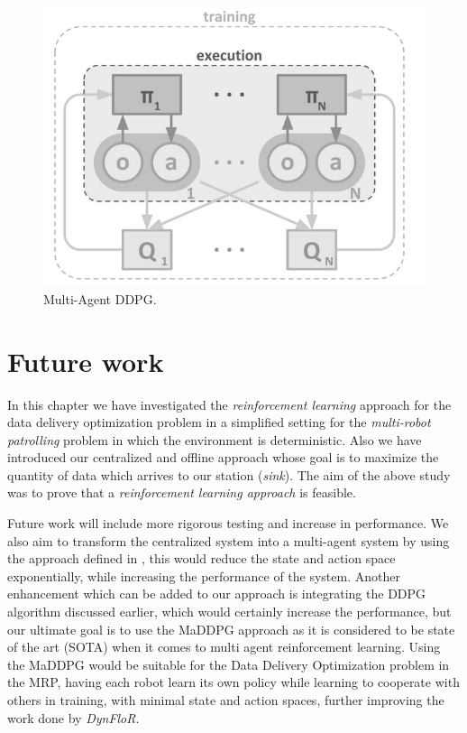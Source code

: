 \begin{figure}[!htb]
\centering
\includegraphics[scale=0.4]{Figures/maddpg.jpg}
\caption{Multi-Agent DDPG.}
\label{fig:maddpg}
\end{figure}

\section{Future work}
In this chapter we have investigated the \emph{reinforcement learning} approach for the data delivery optimization problem in a simplified setting for the \emph{multi-robot patrolling} problem in which the environment is deterministic. Also we have introduced our centralized and offline approach whose goal is to maximize the quantity of data which arrives to our station (\emph{sink}). The aim of the above study was to prove that a \emph{reinforcement learning approach} is feasible.
\par Future work will include more rigorous testing and increase in performance. We also aim to transform the centralized system into a multi-agent system by using the approach defined in \cite{zhang2019multiagent}, this would reduce the state and action space exponentially, while increasing the performance of the system. Another enhancement which can be added to our approach is integrating the DDPG algorithm discussed earlier, which would certainly increase the performance, but our ultimate goal is to use the MaDDPG approach as it is considered to be state of the art (SOTA) when it comes to multi agent reinforcement learning. Using the MaDDPG would be suitable for the Data Delivery Optimization problem in the MRP, having each robot learn its own policy while learning to cooperate with others in training, with minimal state and action spaces, further improving the work done by \emph{DynFloR}.